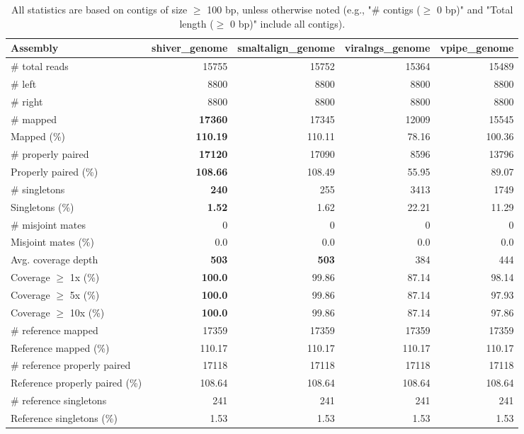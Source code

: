 \documentclass[12pt,a4paper]{article}
\begin{document}
\begin{table}[ht]
\begin{center}
\caption{All statistics are based on contigs of size $\geq$ 100 bp, unless otherwise noted (e.g., "\# contigs ($\geq$ 0 bp)" and "Total length ($\geq$ 0 bp)" include all contigs).}
\begin{tabular}{|l*{4}{|r}|}
\hline
Assembly & shiver\_genome & smaltalign\_genome & viralngs\_genome & vpipe\_genome \\ \hline
\# total reads & 15755 & 15752 & 15364 & 15489 \\ \hline
\# left & 8800 & 8800 & 8800 & 8800 \\ \hline
\# right & 8800 & 8800 & 8800 & 8800 \\ \hline
\# mapped & {\bf 17360} & 17345 & 12009 & 15545 \\ \hline
Mapped (\%) & {\bf 110.19} & 110.11 & 78.16 & 100.36 \\ \hline
\# properly paired & {\bf 17120} & 17090 & 8596 & 13796 \\ \hline
Properly paired (\%) & {\bf 108.66} & 108.49 & 55.95 & 89.07 \\ \hline
\# singletons & {\bf 240} & 255 & 3413 & 1749 \\ \hline
Singletons (\%) & {\bf 1.52} & 1.62 & 22.21 & 11.29 \\ \hline
\# misjoint mates & 0 & 0 & 0 & 0 \\ \hline
Misjoint mates (\%) & 0.0 & 0.0 & 0.0 & 0.0 \\ \hline
Avg. coverage depth & {\bf 503} & {\bf 503} & 384 & 444 \\ \hline
Coverage $\geq$ 1x (\%) & {\bf 100.0} & 99.86 & 87.14 & 98.14 \\ \hline
Coverage $\geq$ 5x (\%) & {\bf 100.0} & 99.86 & 87.14 & 97.93 \\ \hline
Coverage $\geq$ 10x (\%) & {\bf 100.0} & 99.86 & 87.14 & 97.86 \\ \hline
\# reference mapped & 17359 & 17359 & 17359 & 17359 \\ \hline
Reference mapped (\%) & 110.17 & 110.17 & 110.17 & 110.17 \\ \hline
\# reference properly paired & 17118 & 17118 & 17118 & 17118 \\ \hline
Reference properly paired (\%) & 108.64 & 108.64 & 108.64 & 108.64 \\ \hline
\# reference singletons & 241 & 241 & 241 & 241 \\ \hline
Reference singletons (\%) & 1.53 & 1.53 & 1.53 & 1.53 \\ \hline

\end{tabular}
\end{center}
\end{table}
\end{document}
